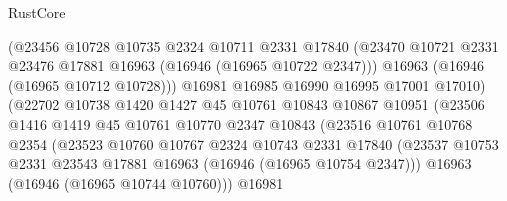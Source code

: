 \begin{lexlean}{RustCore}
\begin{coremodule}
                                (@23456
                                  @10728
                                  @10735
                                  @2324
                                  @10711
                                  @2331
                                  @17840
                                  (@23470
                                    @10721
                                    @2331
                                    @23476
                                    @17881
                                    @16963
                                    (@16946 (@16965 @10722 @2347)))
                                  @16963
                                  (@16946 (@16965 @10712 @10728)))
                                @16981
                                @16985
                                @16990
                                @16995
                                @17001
                                @17010)
                              (@22702
                                @10738
                                @1420
                                @1427
                                @45
                                @10761
                                @10843
                                @10867
                                @10951
                                (@23506
                                  @1416
                                  @1419
                                  @45
                                  @10761
                                  @10770
                                  @2347
                                  @10843
                                  (@23516
                                    @10761
                                    @10768
                                    @2354
                                    (@23523
                                      @10760
                                      @10767
                                      @2324
                                      @10743
                                      @2331
                                      @17840
                                      (@23537
                                        @10753
                                        @2331
                                        @23543
                                        @17881
                                        @16963
                                        (@16946 (@16965 @10754 @2347)))
                                      @16963
                                      (@16946 (@16965 @10744 @10760)))
                                    @16981

\end{coremodule}
\end{lexlean}
